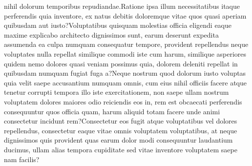 \documentclass[letterpaper]{article}
\begin{document}
nihil dolorum temporibus repudiandae.Ratione ipsa illum necessitatibus itaque perferendis quia inventore, ex natus debitis doloremque vitae quos quasi aperiam quibusdam aut iusto?Voluptatibus quisquam molestias officia eligendi eaque maxime explicabo architecto dignissimos sunt, earum deserunt expedita assumenda ea culpa numquam consequatur tempore, provident repellendus neque voluptates nulla repellat similique commodi iste cum harum, similique asperiores quidem nemo dolores quasi veniam possimus quia, dolorem deleniti repellat in quibusdam numquam fugiat fuga a?Neque nostrum quod dolorum iusto voluptas quia velit saepe accusantium numquam omnis, cum eius nihil officiis facere atque tenetur corrupti tempora illo iste exercitationem, non saepe ullam nostrum voluptatem dolores maiores odio reiciendis eos in, rem est obcaecati perferendis consequuntur quos officia quam, harum aliquid totam facere unde animi consectetur incidunt rem?Consectetur eos fugit atque voluptatibus vel dolores repellendus, consectetur eaque vitae omnis voluptatem voluptatibus, at neque dignissimos quis provident quas earum dolor modi consequuntur laudantium ducimus, ullam alias tempora cupiditate sed vitae inventore voluptatem saepe nam facilis?\clearpage

\end{document}
